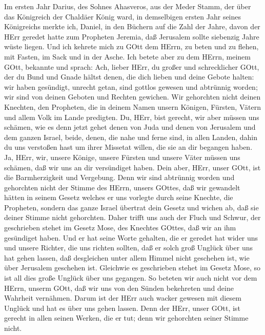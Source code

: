  Im ersten Jahr Darius, des Sohnes Ahasveros, aus der Meder
Stamm, der über das Königreich der Chaldäer König ward,  in
demselbigen ersten Jahr seines Königreichs merkte ich, Daniel, in den
Büchern auf die Zahl der Jahre, davon der HErr geredet hatte zum
Propheten Jeremia, daß Jerusalem sollte siebenzig Jahre wüste liegen.
 Und ich kehrete mich zu GOtt dem HErrn, zu beten und zu
flehen, mit Fasten, im Sack und in der Asche.  Ich betete
aber zu dem HErrn, meinem GOtt, bekannte und sprach: Ach, lieber HErr,
du großer und schrecklicher GOtt, der du Bund und Gnade hältst denen,
die dich lieben und deine Gebote halten:  wir haben
gesündigt, unrecht getan, sind gottlos gewesen und abtrünnig worden; wir
sind von deinen Geboten und Rechten gewichen.  Wir
gehorchten nicht deinen Knechten, den Propheten, die in deinem Namen
unsern Königen, Fürsten, Vätern und allem Volk im Lande predigten.
 Du, HErr, bist gerecht, wir aber müssen uns schämen, wie es
denn jetzt gehet denen von Juda und denen von Jerusalem und dem ganzen
Israel, beide, denen, die nahe und ferne sind, in allen Landen, dahin du
uns verstoßen hast um ihrer Missetat willen, die sie an dir begangen
haben.  Ja, HErr, wir, unsere Könige, unsere Fürsten und
unsere Väter müssen uns schämen, daß wir uns an dir versündiget haben.
 Dein aber, HErr, unser GOtt, ist die Barmherzigkeit und
Vergebung. Denn wir sind abtrünnig worden  und gehorchten
nicht der Stimme des HErrn, unsers GOttes, daß wir gewandelt hätten in
seinem Gesetz welches er uns vorlegte durch seine Knechte, die
Propheten,  sondern das ganze Israel übertrat dein Gesetz
und wichen ab, daß sie deiner Stimme nicht gehorchten. Daher trifft uns
auch der Fluch und Schwur, der geschrieben stehet im Gesetz Mose, des
Knechtes GOttes, daß wir an ihm gesündiget haben.  Und er
hat seine Worte gehalten, die er geredet hat wider uns und unsere
Richter, die uns richten sollten, daß er solch groß Unglück über uns hat
gehen lassen, daß desgleichen unter allem Himmel nicht geschehen ist,
wie über Jerusalem geschehen ist.  Gleichwie es geschrieben
stehet im Gesetz Mose, so ist all dies große Unglück über uns gegangen.
So beteten wir auch nicht vor dem HErrn, unserm GOtt, daß wir uns von
den Sünden bekehreten und deine Wahrheit vernähmen.  Darum
ist der HErr auch wacker gewesen mit diesem Unglück und hat es über uns
gehen lassen. Denn der HErr, unser GOtt, ist gerecht in allen seinen
Werken, die er tut; denn wir gehorchten seiner Stimme nicht.
